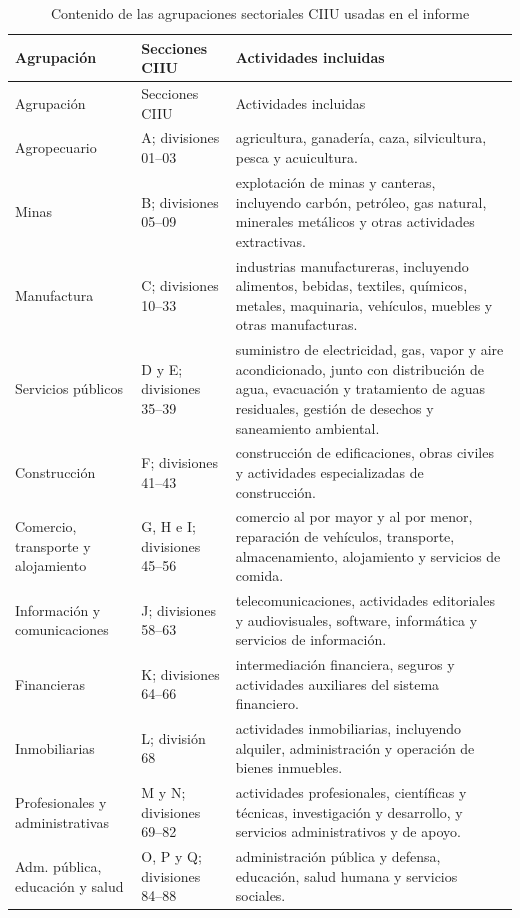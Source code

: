 \begin{longtable}{p{}p{}p{}}
\caption{Contenido de las agrupaciones sectoriales CIIU usadas en el informe}
\label{tab:sector_definiciones_ciiu}\\
\toprule
Agrupación & Secciones CIIU & Actividades incluidas \\
\midrule
\endfirsthead
\toprule
Agrupación & Secciones CIIU & Actividades incluidas \\
\midrule
\endhead
Agropecuario & A; divisiones 01--03 & agricultura, ganadería, caza, silvicultura, pesca y acuicultura. \\
Minas & B; divisiones 05--09 & explotación de minas y canteras, incluyendo carbón, petróleo, gas natural, minerales metálicos y otras actividades extractivas. \\
Manufactura & C; divisiones 10--33 & industrias manufactureras, incluyendo alimentos, bebidas, textiles, químicos, metales, maquinaria, vehículos, muebles y otras manufacturas. \\
Servicios públicos & D y E; divisiones 35--39 & suministro de electricidad, gas, vapor y aire acondicionado, junto con distribución de agua, evacuación y tratamiento de aguas residuales, gestión de desechos y saneamiento ambiental. \\
Construcción & F; divisiones 41--43 & construcción de edificaciones, obras civiles y actividades especializadas de construcción. \\
Comercio, transporte y alojamiento & G, H e I; divisiones 45--56 & comercio al por mayor y al por menor, reparación de vehículos, transporte, almacenamiento, alojamiento y servicios de comida. \\
Información y comunicaciones & J; divisiones 58--63 & telecomunicaciones, actividades editoriales y audiovisuales, software, informática y servicios de información. \\
Financieras & K; divisiones 64--66 & intermediación financiera, seguros y actividades auxiliares del sistema financiero. \\
Inmobiliarias & L; división 68 & actividades inmobiliarias, incluyendo alquiler, administración y operación de bienes inmuebles. \\
Profesionales y administrativas & M y N; divisiones 69--82 & actividades profesionales, científicas y técnicas, investigación y desarrollo, y servicios administrativos y de apoyo. \\
Adm. pública, educación y salud & O, P y Q; divisiones 84--88 & administración pública y defensa, educación, salud humana y servicios sociales. \\

\end{longtable}

